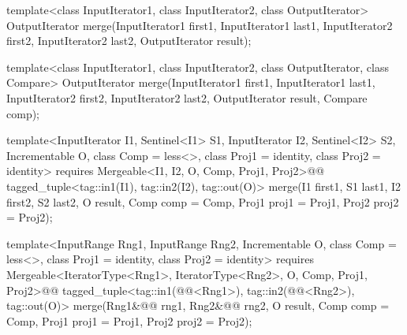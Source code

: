 %
\begin{removedblock}
\begin{itemdecl}
template<class InputIterator1, class InputIterator2,
         class OutputIterator>
  OutputIterator
    merge(InputIterator1 first1, InputIterator1 last1,
          InputIterator2 first2, InputIterator2 last2,
          OutputIterator result);

template<class InputIterator1, class InputIterator2,
         class OutputIterator, class Compare>
  OutputIterator
    merge(InputIterator1 first1, InputIterator1 last1,
          InputIterator2 first2, InputIterator2 last2,
          OutputIterator result, Compare comp);
\end{itemdecl}
\end{removedblock}
\begin{addedblock}
\begin{itemdecl}
template<InputIterator I1, Sentinel<I1> S1, InputIterator I2, Sentinel<I2> S2,
    Incrementable O, class Comp = less<>, class Proj1 = identity,
    class Proj2 = identity>
  requires Mergeable<I1, I2, O, Comp, Proj1, Proj2>@\newtxt{()}@
  tagged_tuple<tag::in1(I1), tag::in2(I2), tag::out(O)>
    merge(I1 first1, S1 last1, I2 first2, S2 last2, O result,
          Comp comp = Comp{}, Proj1 proj1 = Proj1{}, Proj2 proj2 = Proj2{});

template<InputRange Rng1, InputRange Rng2, Incrementable O, class Comp = less<>,
    class Proj1 = identity, class Proj2 = identity>
  requires Mergeable<IteratorType<Rng1>, IteratorType<Rng2>, O, Comp, Proj1, Proj2>@\newtxt{()}@
  tagged_tuple<tag::in1(@@<Rng1>),
               tag::in2(@@<Rng2>),
               tag::out(O)>
    merge(Rng1&@\newtxt{\&}@ rng1, Rng2&@\newtxt{\&}@ rng2, O result,
          Comp comp = Comp{}, Proj1 proj1 = Proj1{}, Proj2 proj2 = Proj2{});
\end{itemdecl}
\end{addedblock}

